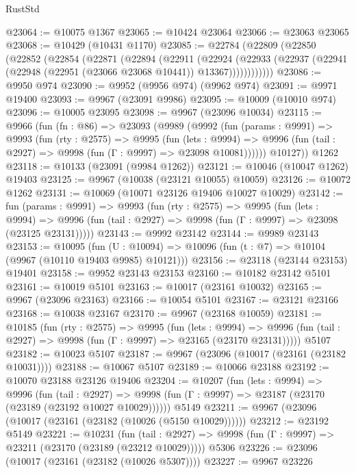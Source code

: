 \begin{lexlean}{RustStd}
\begin{coremodule}
@23064 := @10075 @1367
@23065 := @10424 @23064
@23066 := @23063 @23065
@23068 := @10429 (@10431 @1170)
@23085 := @22784
    (@22809
      (@22850
        (@22852
          (@22854
            (@22871
              (@22894
                (@22911
                  (@22924
                    (@22933
                      (@22937 (@22941 (@22948 (@22951 (@23066 @23068 @10441)) @13367))))))))))))
@23086 := @9950 @974
@23090 := @9952 (@9956 @974) (@9962 @974)
@23091 := @9971 @19400
@23093 := @9967 (@23091 @9986)
@23095 := @10009 (@10010 @974)
@23096 := @10005 @23095
@23098 := @9967 (@23096 @10034)
@23115 := @9966
    (fun (fn : @86) =>
    @23093
      (@9989
        (@9992
          (fun (params : @9991) =>
          @9993
            (fun (rty : @2575) =>
            @9995
              (fun (lets : @9994) =>
              @9996 (fun (tail : @2927) => @9998 (fun (Γ : @9997) => @23098 @10081))))))
        @10127))
    @1262
@23118 := @10133 (@23091 (@9984 @1262))
@23121 := @10046 (@10047 @1262) @19403
@23125 := @9967 (@10038 (@23121 @10055) @10059)
@23126 := @10072 @1262
@23131 := @10069 (@10071 @23126 @19406 @10027 @10029)
@23142 := fun (params : @9991) =>
  @9993
    (fun (rty : @2575) =>
    @9995
      (fun (lets : @9994) =>
      @9996 (fun (tail : @2927) => @9998 (fun (Γ : @9997) => @23098 (@23125 @23131)))))
@23143 := @9992 @23142
@23144 := @9989 @23143
@23153 := @10095
    (fun (U : @10094) => @10096 (fun (t : @7) => @10104 (@9967 (@10110 @19403 @9985) @10121)))
@23156 := @23118 (@23144 @23153) @19401
@23158 := @9952 @23143 @23153
@23160 := @10182 @23142 @5101
@23161 := @10019 @5101
@23163 := @10017 (@23161 @10032)
@23165 := @9967 (@23096 @23163)
@23166 := @10054 @5101
@23167 := @23121 @23166
@23168 := @10038 @23167
@23170 := @9967 (@23168 @10059)
@23181 := @10185
    (fun (rty : @2575) =>
    @9995
      (fun (lets : @9994) =>
      @9996 (fun (tail : @2927) => @9998 (fun (Γ : @9997) => @23165 (@23170 @23131)))))
    @5107
@23182 := @10023 @5107
@23187 := @9967 (@23096 (@10017 (@23161 (@23182 @10031))))
@23188 := @10067 @5107
@23189 := @10066 @23188
@23192 := @10070 @23188 @23126 @19406
@23204 := @10207
    (fun (lets : @9994) =>
    @9996
      (fun (tail : @2927) =>
      @9998 (fun (Γ : @9997) => @23187 (@23170 (@23189 (@23192 @10027 @10029))))))
    @5149
@23211 := @9967 (@23096 (@10017 (@23161 (@23182 (@10026 (@5150 @10029))))))
@23212 := @23192 @5149
@23221 := @10231
    (fun (tail : @2927) => @9998 (fun (Γ : @9997) => @23211 (@23170 (@23189 (@23212 @10029)))))
    @5306
@23226 := @23096 (@10017 (@23161 (@23182 (@10026 @5307))))
@23227 := @9967 @23226

\end{coremodule}
\end{lexlean}
